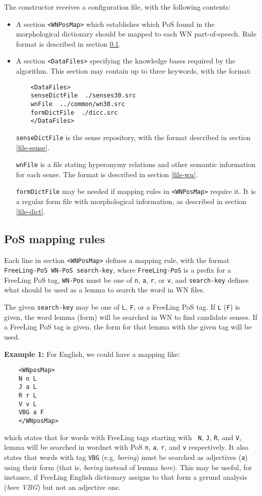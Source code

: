 \documentclass[a4paper]{book}
\begin{document}
  The constructor receives a configuration file, with the following contents:
\begin{itemize}
 \item A section \verb#<WNPosMap># which establishes which PoS found
   in the morphological dictionary should be mapped to each WN
   part-of-speech. Rule format is described in section \ref{wnmap}.

 \item A section \verb#<DataFiles># specifying
  the knowledge bases required by the algorithm.
  This section may contain up to three keywords, with the format:
  \begin{verbatim}
    <DataFiles>
    senseDictFile  ./senses30.src
    wnFile  ../common/wn30.src
    formDictFile  ./dicc.src
    </DataFiles>
  \end{verbatim}

  \verb#senseDictFile# is the sense repository, with the format
  described in section \ref{file-sense}.

  \verb#wnFile# is a file stating hyperonymy relations and other semantic
   information for each sense. The format is described in section \ref{file-wn}.

  \verb#formDictFile# may be needed if mapping rules in
  \verb#<WNPosMap># require it.  It is a regular form file with morphological information,
   as described in section \ref{file-dict}.
\end{itemize}
 
\subsection{PoS mapping rules} 
\label{wnmap}

  Each line in section \verb#<WNPosMap># defines a mapping rule, with
  the format \verb#FreeLing-PoS WN-PoS search-key#, where
  \verb#FreeLing-PoS# is a prefix for a FreeLing PoS tag,
  \verb#WN-Pos# must be one of {\tt n}, {\tt a}, {\tt r}, or {\tt v},
  and \verb#search-key# defines what should be used as a lemma to
  search the word in WN files.

   The given \verb#search-key# may be one of {\tt L}, {\tt F}, or a
   FreeLing PoS tag.  If {\tt L} ({\tt F}) is given, the word lemma
   (form) will be searched in WN to find candidate senses.  If a
   FreeLing PoS tag is given, the form for that lemma with the given
   tag will be used.
  \medskip
    
  \noindent \textbf{Example 1:} For English, we could have a mapping like:
   \begin{verbatim}
    <WNposMap>
    N n L
    J a L
    R r L
    V v L
    VBG a F
    </WNposMap>
   \end{verbatim}
   which states that for words with FreeLing tags starting with {\tt
     N}, {\tt J}, {\tt R}, and {\tt V}, lemma will be searched in
   wordnet with PoS {\tt n}, {\tt a}, {\tt r}, and {\tt v}
   respectively.  It also states that words with tag {\tt VBG}
   (e.g. {\sl boring}) must be searched as adjectives ({\tt a}) using
   their form (that is, {\sl boring} instead of lemma {\sl bore}).
   This may be useful, for instance, if FreeLing English dictionary
   assigns to that form a gerund analysis ({\sl bore VBG}) but not an 
   adjective one.
  \medskip
   
\end{document}
